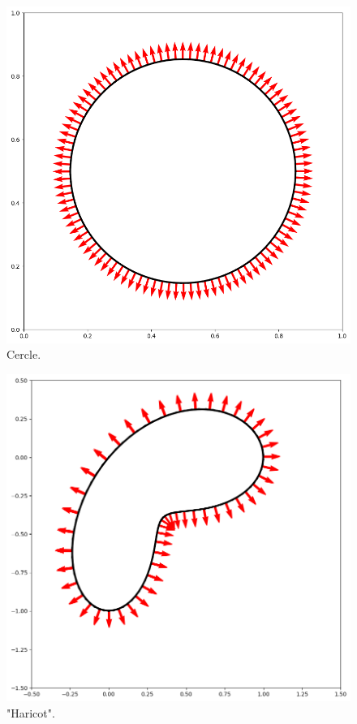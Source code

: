 \documentclass[french]{article}
\begin{document}
	\begin{minipage}{0.33\linewidth}
		\begin{figure}[H]
			\centering
			\includegraphics[width=\linewidth]{"levelset/circle/curve_circle.png"}
			\caption{Cercle.}
		\end{figure}
	\end{minipage}
	\begin{minipage}{0.33\linewidth}
		\begin{figure}[H]
			\centering
			\includegraphics[width=\linewidth]{"levelset/bean/curve_bean.png"}
			\caption{"Haricot".}
		\end{figure}
	\end{minipage}
\end{document}
